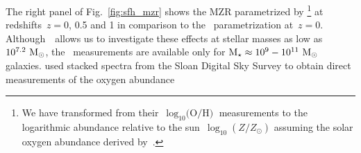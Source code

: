 \documentclass[ms.tex]{subfiles}
\begin{document}
\par
The right panel of Fig.~\ref{fig:sfh_mzr} shows the MZR parametrized by
\citet[][see their equation 5]{Zahid2014}\footnote{
	We have transformed from their~$\log_{10}\text{(O/H)}$ measurements to the
	logarithmic abundance relative to the sun~$\log_{10}(Z / Z_\odot)$ assuming
	the solar oxygen abundance derived by~\citet{Asplund2009}.
} at redshifts~$z = 0$, 0.5 and 1 in comparison to the~\citet{Andrews2013}
parametrization at~$z = 0$.
Although~\um~allows us to investigate these effects at stellar masses as low as
$10^{7.2}~\text{M}_\odot$, the~\citet{Zahid2014} measurements are available only for
$\text{M}_\star \approx 10^9 - 10^{11}~\text{M}_\odot$ galaxies.
\citet{Andrews2013} used stacked spectra from the Sloan Digital Sky Survey
\citep[SDSS;][]{York2000} to obtain direct measurements of the oxygen abundance
\end{document}
